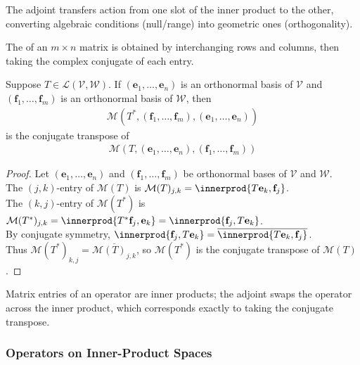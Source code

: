 The adjoint transfers action from one slot of the inner product to the other, converting algebraic conditions (null/range) into geometric ones (orthogonality).

\begin{definition} The  of an $m \times n$ matrix is obtained by interchanging rows and columns, then taking the complex conjugate of each entry.
\end{definition}

\begin{proposition} Suppose $T \in \mathcal{L}(\mathcal{V}, \mathcal{W})$. If $(\mathbf{e}_1, \ldots, \mathbf{e}_n)$ is an orthonormal basis of $\mathcal{V}$ and $(\mathbf{f}_1, \ldots, \mathbf{f}_m)$ is an orthonormal basis of $\mathcal{W}$, then
\begin{align}
\mathcal{M}(T^*, (\mathbf{f}_1, \ldots, \mathbf{f}_m), (\mathbf{e}_1, \ldots, \mathbf{e}_n)) \nonumber
\end{align}
is the conjugate transpose of
\begin{align}
\mathcal{M}(T, (\mathbf{e}_1, \ldots, \mathbf{e}_n), (\mathbf{f}_1, \ldots, \mathbf{f}_m)) \nonumber
\end{align}
\begin{proof} Let $(\mathbf{e}_1, \ldots, \mathbf{e}_n)$ and $(\mathbf{f}_1, \ldots, \mathbf{f}_m)$ be orthonormal bases of $\mathcal{V}$ and $\mathcal{W}$.\\
The $(j, k)$-entry of $\mathcal{M}(T)$ is $\mathcal{M}(T)_{j, k} = \innerprod{T \mathbf{e}_k, \mathbf{f}_j}$.\\
The $(k, j)$-entry of $\mathcal{M}(T^*)$ is $\mathcal{M}(T^*)_{j, k} = \innerprod{T^* \mathbf{f}_j, \mathbf{e}_k} = \innerprod{\mathbf{f}_j, T \mathbf{e}_k}$.\\
By conjugate symmetry, $\innerprod{\mathbf{f}_j, T \mathbf{e}_k} = \overline{\innerprod{T \mathbf{e}_k, \mathbf{f}_j}}$.\\
Thus $\mathcal{M}(T^*)_{k, j} = \overline{\mathcal{M}(T)_{j, k}}$, so $\mathcal{M}(T^*)$ is the conjugate transpose of $\mathcal{M}(T)$.
\end{proof}
\end{proposition}

Matrix entries of an operator are inner products; the adjoint swaps the operator across the inner product, which corresponds exactly to taking the conjugate transpose.

\subsubsection{Operators on Inner-Product Spaces}


